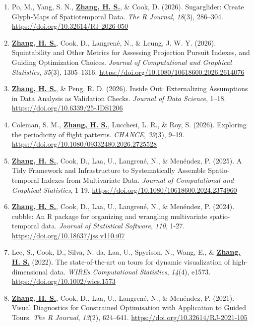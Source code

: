 \documentclass[10pt,a4paper]{article} %
\begin{document}
\begin{enumerate}[itemsep=0.1em]

    \item Po, M., Yang, S. N., \underline{\textbf{Zhang, H. S.}}, \& Cook, D. (2026).
    Sugarglider: Create Glyph-Maps of Spatiotemporal Data.
    \emph{The R Journal}, \emph{18}(3), 286--304. \url{https://doi.org/10.32614/RJ-2026-050}

    \item \underline{\textbf{Zhang, H. S.}}, Cook, D., Langren\'e, N., \& Leung, J. W. Y. (2026). 
    Squintability and Other Metrics for Assessing Projection Pursuit Indexes, and Guiding 
    Optimization Choices. \emph{Journal of Computational and Graphical Statistics}, \emph{35}(3), 1305--1316. 
    \url{https://doi.org/10.1080/10618600.2026.2614076}

    \item \underline{\textbf{Zhang, H. S.}}, \& Peng, R. D. (2026). Inside Out: Externalizing Assumptions 
    in Data Analysis as Validation Checks. \emph{Journal of Data Science}, 1--18. 
    \url{https://doi.org/10.6339/25-JDS1206}
    
    \item Coleman, S. M., \underline{\textbf{Zhang, H. S.}}, Lucchesi, L. R., \& Roy, S. (2026).
    Exploring the periodicity of flight patterns.
    \emph{CHANCE}, \emph{39}(3), 9--19. \url{https://doi.org/10.1080/09332480.2026.2725528}

    \item \underline{\textbf{Zhang, H. S.}}, Cook, D., Laa, U., Langren\'e, N., \& Men\'endez, P. (2025).
    A Tidy Framework and Infrastructure to Systematically Assemble Spatio-temporal Indexes
    from Multivariate Data. \emph{Journal of Computational and Graphical Statistics},
    1-19. \url{https://doi.org/10.1080/10618600.2024.2374960}

    \item \underline{\textbf{Zhang, H. S.}}, Cook, D., Laa, U., Langren\'e, N., \& Men\'endez, P. (2024). 
    cubble: An R package for organizing and wrangling multivariate spatio-temporal data. 
    \emph{Journal of Statistical Software}, \emph{110}, 1-27. \url{https://doi.org/10.18637/jss.v110.i07}
    
    \item Lee, S., Cook, D., Silva, N. da, Laa, U., Spyrison, N., Wang, E., \& 
    \underline{\textbf{Zhang, H. S.}} (2022). The state-of-the-art on tours for 
    dynamic visualization of high-dimensional data. \emph{WIREs Computational Statistics}, 
    \emph{14}(4), e1573. \url{https://doi.org/10.1002/wics.1573}
    
    \item \underline{\textbf{Zhang, H. S.}}, Cook, D., Laa, U., Langren\'e, N., \& Men\'endez, P. (2021). 
    Visual Diagnostics for Constrained Optimisation with Application to Guided Tours. 
    \emph{The R Journal}, \emph{13}(2), 624--641. \url{https://doi.org/10.32614/RJ-2021-105}
    
\end{enumerate}
\end{document}
